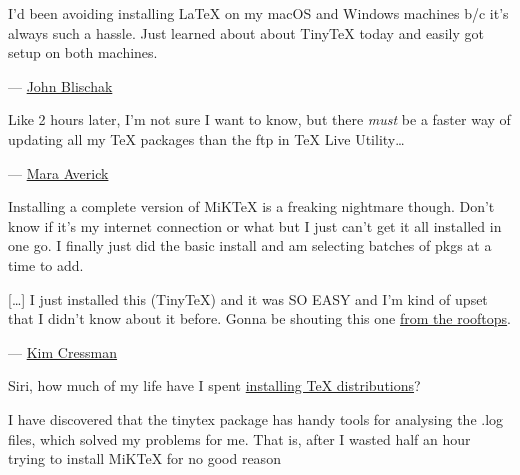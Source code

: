 \documentclass[
  xelatex,ja=standard,jafont=noto]{bxjsreport}
\renewenvironment{quote}{\def\FrameCommand{{\color{quotebarcolor}{\vrule width 3pt}}\hspace{10pt}}\MakeFramed{\advance\hsize-\width\FrameRestore}}{\endMakeFramed}
\begin{document}
\begin{quote}
I'd been avoiding installing LaTeX on my macOS and Windows machines b/c
it's always such a hassle. Just learned about about TinyTeX today and
easily got setup on both machines.
\end{quote}

\begin{quote}
--- \href{https://twitter.com/jdblischak/status/974066342780461056}{John
Blischak}
\end{quote}

\begin{quote}
Like 2 hours later, I'm not sure I want to know, but there \emph{must}
be a faster way of updating all my TeX packages than the ftp in TeX Live
Utility\ldots{}
\end{quote}

\begin{quote}
--- \href{https://twitter.com/dataandme/status/994531189217259521}{Mara
Averick}
\end{quote}

\begin{quote}
Installing a complete version of MiKTeX is a freaking nightmare though.
Don't know if it's my internet connection or what but I just can't get
it all installed in one go. I finally just did the basic install and am
selecting batches of pkgs at a time to add.
\end{quote}

\begin{quote}
{[}\ldots{]} I just installed this (TinyTeX) and it was SO EASY and I'm
kind of upset that I didn't know about it before. Gonna be shouting this
one \href{https://twitter.com/swmpkim/status/1014546819085369344}{from
the rooftops}.
\end{quote}

\begin{quote}
--- \href{https://twitter.com/swmpkim/status/1014514680088399874}{Kim
Cressman}
\end{quote}

\begin{quote}
Siri, how much of my life have I spent
\href{https://twitter.com/djnavarro/status/1112674242523361281}{installing
TeX distributions}?
\end{quote}

\begin{quote}
I have discovered that the tinytex package has handy tools for analysing
the .log files, which solved my problems for me. That is, after I wasted
half an hour trying to install MiKTeX for no good reason
\end{quote}
\end{document}
